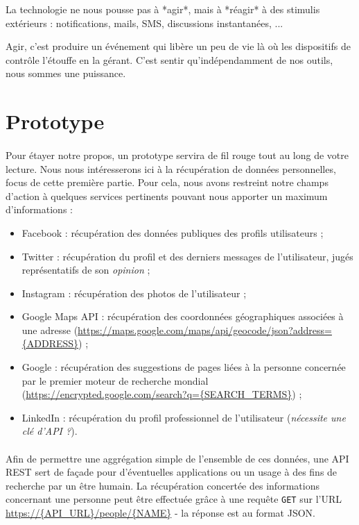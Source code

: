 La technologie ne nous pousse pas à *agir*, mais à *réagir* à des stimulis extérieurs :
notifications, mails, SMS, discussions instantanées, ...

Agir, c'est produire un événement qui libère un peu de vie là où les dispositifs de contrôle
l'étouffe en la gérant. C'est sentir qu'indépendamment de nos outils, nous sommes une puissance.


\section*{Prototype}

\paragraph{} Pour étayer notre propos, un prototype servira de fil rouge tout au
long de votre lecture. Nous nous intéresserons ici à la récupération de données personnelles,
focus de cette première partie. Pour cela, nous avons restreint notre champs d'action à quelques
services pertinents pouvant nous apporter un maximum d'informations :

\begin{itemize}
    \item Facebook : récupération des données publiques des profils utilisateurs ;
    \item Twitter : récupération du profil et des derniers messages de l'utilisateur, jugés
    représentatifs de son \emph{opinion} ;
    \item Instagram : récupération des photos de l'utilisateur ; 
    \item Google Maps API : récupération des coordonnées géographiques associées à une adresse
    (\url{https://maps.google.com/maps/api/geocode/json?address={ADDRESS}}) ;
    \item Google : récupération des suggestions de pages liées à la personne concernée par le
    premier moteur de recherche mondial (\url{https://encrypted.google.com/search?q={SEARCH_TERMS}}) ;
    \item LinkedIn : récupération du profil professionnel de l'utilisateur (\emph{nécessite une clé d'API ?}).
\end{itemize}

\paragraph{} Afin de permettre une aggrégation simple de l'ensemble de ces données, une 
API REST sert de façade pour d'éventuelles applications ou un usage à des fins de recherche
par un être humain. La récupération concertée des informations concernant une personne peut
être effectuée grâce à une requête \lstinline{GET} sur l'URL \url{https://{API_URL}/people/{NAME}}
- la réponse est au format JSON.


